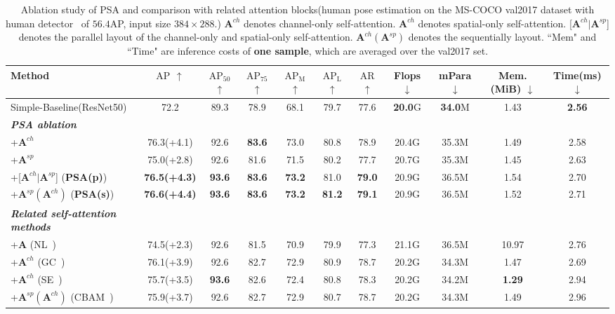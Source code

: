 \documentclass[10pt,twocolumn,letterpaper]{article}
\newcommand{\A}{\mathbf{A}}
\begin{document}
\begin{table*}[!htb]
\centering
\fontsize{7}{8}\selectfont
\setlength{\tabcolsep}{1.6pt}
\begin{tabular}{l||cccccc|c|c|c|c|}
\hline
Method       &   $\mathrm{AP}$ $\uparrow$  & $\mathrm{AP_{50}}$$\uparrow$ & $\mathrm{AP_{75}}$$\uparrow$ & $\mathrm{AP_{M}}$ $\uparrow$ & $\mathrm{AP_{L}}$$\uparrow$  & $\mathrm{AR}$ $\uparrow$ & Flops $\downarrow$ & mPara $\downarrow$ & Mem.(MiB) $\downarrow$& Time(ms)$\downarrow$\\ \hline \hline
Simple-Baseline(ResNet50)~\cite{Xiao18} &72.2 &89.3 &78.9 &68.1 &79.7 &77.6 &\textbf{20.0}G&\textbf{34.0}M& 1.43 & \textbf{2.56}\\
\hline
\textbf{\textit{PSA ablation}}    &     &   &   &   &   &    & & & &\\
+$\A^{ch}$    &  76.3(+4.1) & 92.6 & \textbf{83.6} & 73.0 & 80.8 & 78.9   &20.4G &35.3M &  1.49  & 2.58 \\
+$\A^{sp}$    &  75.0(+2.8) & 92.6 & 81.6 & 71.5 & 80.2 & 77.7   &20.7G &35.3M& 1.45 & 2.63  \\
+[$\A^{ch}|\A^{sp}$] (\textbf{PSA(p)})  & \textbf{76.5(+4.3)} & \textbf{93.6} & \textbf{83.6} & \textbf{73.2} & 81.0 &  \textbf{79.0}  &20.9G &36.5M & 1.54 & 2.70 \\
+$\A^{sp}(\A^{ch})$  (\textbf{PSA(s)})  & \textbf{76.6}\textbf{(+4.4)} & \textbf{93.6} & \textbf{83.6} & \textbf{73.2} & \textbf{81.2} & \textbf{79.1}   &20.9G &36.5M & 1.52 & 2.71 \\
\hline
\textbf{\textit{Related self-attention methods}}    &     &   &   &   &   &    & & && \\
 +$\A$ (NL~\cite{Wang18nonlocal}) &  74.5(+2.3) & 92.6 & 81.5 & 70.9 & 79.9 & 77.3   & 21.1G & 36.5M& 10.97 & 2.76 \\
+$\A^{ch}$ (GC~\cite{Cao19})    &  76.1(+3.9) & 92.6 & 82.7 & 72.9 & 80.9 &  78.7  &20.2G &34.3M & 1.47 & 2.69\\
 +$\A^{ch}$ (SE~\cite{Hu18})    &  75.7(+3.5) & \textbf{93.6} & 82.6 & 72.4 & 80.8 & 78.3   &20.2G &34.2M & \textbf{1.29} & 2.94 \\
 +$\A^{sp}(\A^{ch})$ (CBAM~\cite{Sanghyun2018cbam})   & 75.9(+3.7) & 92.6 & 82.7 & 72.9 & 80.7 &  78.7  & 20.2G & 34.3M& 1.49 & 2.96\\ 
  
\hline
\end{tabular}
\caption{Ablation study of PSA and comparison with related attention blocks(human pose estimation on the MS-COCO val2017 dataset with human detector~\cite{Xiao18} of $56.4$AP, input size $384\times 288$.) $\A^{ch}$ denotes channel-only self-attention. $\A^{ch}$ denotes spatial-only self-attention. [$\A^{ch}|\A^{sp}$] denotes the parallel layout of the channel-only and spatial-only self-attention. $\A^{ch}(\A^{sp})$ denotes the sequentially layout. ``Mem" and ``Time" are inference costs of \textbf{one sample}, which are averaged over the val2017 set.}
\label{table:Ablation}
\end{table*}
\end{document}
